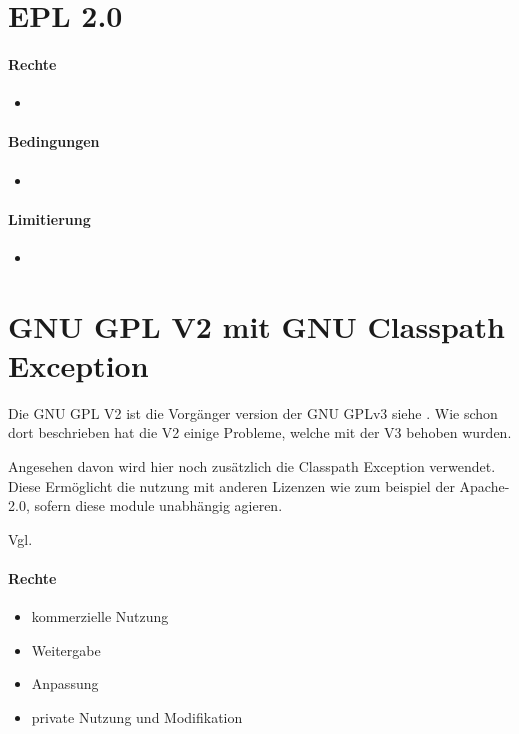 \section{EPL 2.0}


\paragraph{Rechte}
\begin{itemize}
    \item
\end{itemize}
\paragraph{Bedingungen}
\begin{itemize}
    \item
\end{itemize}

\paragraph{Limitierung}
\begin{itemize}
    \item
\end{itemize}

\section{GNU GPL V2 mit GNU Classpath Exception}\label{sec:gnu-gpl-v2-mit-gnu-classpath-exception}
Die GNU GPL V2 ist die Vorgänger version der GNU GPLv3 siehe .
Wie schon dort beschrieben hat die V2 einige Probleme, welche mit der V3 behoben wurden.

Angesehen davon wird hier noch zusätzlich die Classpath Exception verwendet.
Diese Ermöglicht die nutzung mit anderen Lizenzen wie zum beispiel der Apache-2.0,
sofern diese module unabhängig agieren.

Vgl. \cite{gnu-classPath}

\paragraph{Rechte}
\begin{itemize}
    \item kommerzielle Nutzung
    \item Weitergabe
    \item Anpassung
    \item private Nutzung und Modifikation
\end{itemize}
